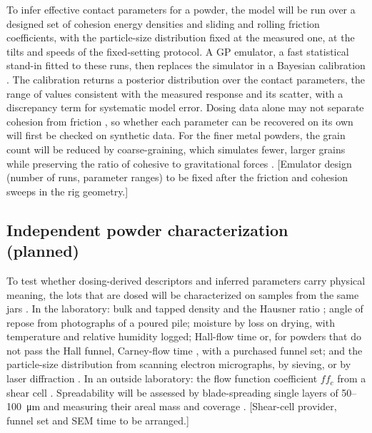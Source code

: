 \documentclass[preprint,12pt]{elsarticle}
\newcommand{\ph}[1]{\textcolor{orange!75!black}{\textsf{[#1]}}}
\begin{document}
To infer effective contact parameters for a powder, the model will be run over a designed set of cohesion energy densities and sliding and rolling friction coefficients, with the particle-size distribution fixed at the measured one, at the tilts and speeds of the fixed-setting protocol. A GP emulator, a fast statistical stand-in fitted to these runs, then replaces the simulator in a Bayesian calibration \cite{Kennedy2001Bayesian,Higdon2008Computer}. The calibration returns a posterior distribution over the contact parameters, the range of values consistent with the measured response and its scatter, with a discrepancy term for systematic model error. Dosing data alone may not separate cohesion from friction \cite{Coetzee2017Review,Richter2020Development,ElKassem2021Sensitivity}, so whether each parameter can be recovered on its own will first be checked on synthetic data. For the finer metal powders, the grain count will be reduced by coarse-graining, which simulates fewer, larger grains while preserving the ratio of cohesive to gravitational forces \cite{Girnth2024Dimensionless}. \ph{Emulator design (number of runs, parameter ranges) to be fixed after the friction and cohesion sweeps in the rig geometry.}

\subsection{Independent powder characterization (planned)}
\label{sec:charac}

To test whether dosing-derived descriptors and inferred parameters carry physical meaning, the lots that are dosed will be characterized on samples from the same jars \cite{ASTMF3049}. In the laboratory: bulk and tapped density and the Hausner ratio \cite{ASTMB527}; angle of repose from photographs of a poured pile; moisture by loss on drying, with temperature and relative humidity logged; Hall-flow time \cite{ASTMB213} or, for powders that do not pass the Hall funnel, Carney-flow time \cite{ASTMB964}, with a purchased funnel set; and the particle-size distribution from scanning electron micrographs, by sieving, or by laser diffraction \cite{ASTMB822}. In an outside laboratory: the flow function coefficient $ff_c$ from a shear cell \cite{ASTMD7891,Schulze2021Powders}. Spreadability will be assessed by blade-spreading single layers of 50--100~\si{\micro\metre} and measuring their areal mass and coverage \cite{Snow2019Development,Cordova2020Measuring}. \ph{Shear-cell provider, funnel set and SEM time to be arranged.}
\end{document}
